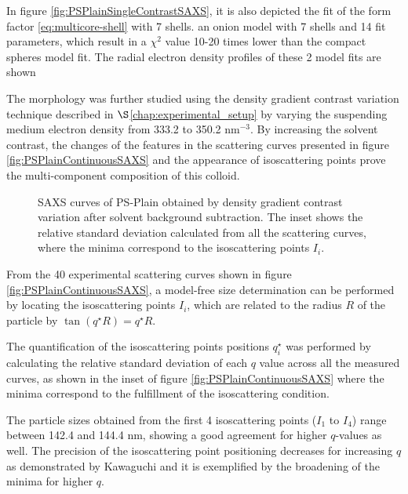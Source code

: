 In figure \ref{fig:PSPlainSingleContrastSAXS}, it is also depicted the fit of the form factor \ref{eq:multicore-shell} with 7 shells. 
 an onion model with 7 shells and 14 fit parameters, which result in a $\chi^2$ value 10-20 times lower than the compact spheres model fit. The radial electron density profiles of these 2 model fits are shown


The morphology was further studied using the density gradient contrast variation technique described in $\S$\ref{chap:experimental_setup} by varying the suspending medium electron density from 333.2 to 350.2 nm$^{-3}$. By increasing the solvent contrast, the changes of the features in the scattering curves presented in figure \ref{fig:PSPlainContinuousSAXS} and the appearance of isoscattering points prove the multi-component composition of this colloid.

\begin{figure}%
	\centering
	\caption{SAXS curves of PS-Plain obtained by density gradient contrast variation after solvent background subtraction. The inset shows the relative standard
deviation calculated from all the scattering curves, where the minima correspond to the isoscattering points $I_i$.}
\end{figure}



From the 40 experimental scattering curves shown in figure \ref{fig:PSPlainContinuousSAXS}, a model-free size determination can be performed by locating the isoscattering points $I_i$, which are related to the radius $R$ of the particle by $\tan\left( q^{\star}R \right)=q^{\star}R$\citep{kawaguchi_x-ray_1983-1}.

The quantification of the isoscattering points positions $q_i^{\star}$ was performed by calculating the relative standard deviation of each $q$ value across all the measured curves, as shown in the inset of 
figure \ref{fig:PSPlainContinuousSAXS} where the minima correspond to the fulfillment of the isoscattering condition. 

The particle sizes obtained from the first 4 isoscattering points ($I_1$ to $I_4$) range between 142.4 and 144.4 nm, showing a good agreement for higher $q$-values as well. The precision of the isoscattering point positioning decreases for increasing $q$ as demonstrated by Kawaguchi\citep{kawaguchi_isoscattering_1992} and it is exemplified by the broadening of the minima for higher $q$.

